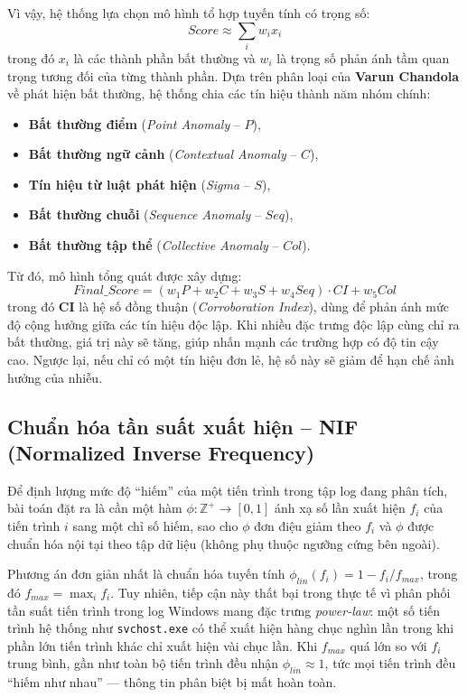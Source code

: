 \documentclass[../main.tex]{subfiles}
\begin{document}
Vì vậy, hệ thống lựa chọn mô hình tổ hợp tuyến tính có trọng số:
\begin{equation}
    Score \approx \sum_i w_i x_i \tag{1.3}
\end{equation}
trong đó $x_i$ là các thành phần bất thường và $w_i$ là trọng số phản ánh tầm quan trọng tương đối của từng thành phần. Dựa trên phân loại của \textbf{Varun Chandola} về phát hiện bất thường, hệ thống chia các tín hiệu thành năm nhóm chính:
\begin{itemize}
    \item \textbf{Bất thường điểm} (\textit{Point Anomaly} – $P$),
    \item \textbf{Bất thường ngữ cảnh} (\textit{Contextual Anomaly} – $C$),
    \item \textbf{Tín hiệu từ luật phát hiện} (\textit{Sigma} – $S$),
    \item \textbf{Bất thường chuỗi} (\textit{Sequence Anomaly} – $Seq$),
    \item \textbf{Bất thường tập thể} (\textit{Collective Anomaly} – $Col$).
\end{itemize}

Từ đó, mô hình tổng quát được xây dựng:
\begin{equation}
    Final\_Score = (w_1 P + w_2 C + w_3 S + w_4 Seq) \cdot CI + w_5 Col \tag{1.4}
\end{equation}
trong đó \textbf{CI} là hệ số đồng thuận (\textit{Corroboration Index}), dùng để phản ánh mức độ cộng hưởng giữa các tín hiệu độc lập. Khi nhiều đặc trưng độc lập cùng chỉ ra
bất thường, giá trị này sẽ tăng, giúp nhấn mạnh các trường hợp có độ tin cậy cao.
Ngược lại, nếu chỉ có một tín hiệu đơn lẻ, hệ số này sẽ giảm để hạn chế ảnh hưởng
của nhiễu.


\subsection{Chuẩn hóa tần suất xuất hiện – NIF (Normalized Inverse Frequency)}
\label{subsection:2.4.1}

Để định lượng mức độ ``hiếm'' của một tiến trình trong tập log đang phân tích, bài toán đặt ra là cần một hàm $\phi: \mathbb{Z}^+ \to [0,1]$ ánh xạ số lần xuất hiện $f_i$ của tiến trình $i$ sang một chỉ số hiếm, sao cho $\phi$ đơn điệu giảm theo $f_i$ và $\phi$ được chuẩn hóa nội tại theo tập dữ liệu (không phụ thuộc ngưỡng cứng bên ngoài).

Phương án đơn giản nhất là chuẩn hóa tuyến tính $\phi_{lin}(f_i) = 1 - f_i / f_{max}$, trong đó $f_{max} = \max_i f_i$. Tuy nhiên, tiếp cận này thất bại trong thực tế vì phân phối tần suất tiến trình trong log Windows mang đặc trưng \textit{power-law}: một số tiến trình hệ thống như \texttt{svchost.exe} có thể xuất hiện hàng chục nghìn lần trong khi phần lớn tiến trình khác chỉ xuất hiện vài chục lần. Khi $f_{max}$ quá lớn so với $f_i$ trung bình, gần như toàn bộ tiến trình đều nhận $\phi_{lin} \approx 1$, tức mọi tiến trình đều ``hiếm như nhau'' — thông tin phân biệt bị mất hoàn toàn.
\end{document}
